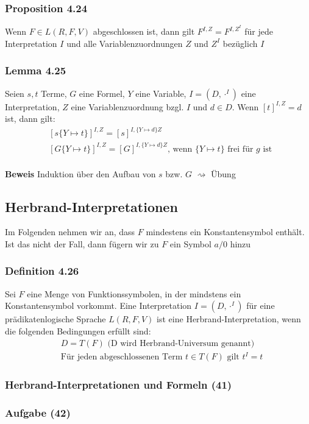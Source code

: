 \subsubsection{Proposition 4.24}
Wenn \(F\in L(R,F,V)\) abgeschlossen ist, dann gilt \(F^{I,Z} = F^{I,Z^I}\) für jede Interpretation \(I\) und alle Variablenzuordnungen \(Z\) und \(Z^I\) bezüglich \(I\)
\subsubsection{Lemma 4.25}
Seien \(s,t\) Terme, \(G\) eine Formel, \(Y\) eine Variable, \(I=(D,\cdot ^I)\) eine Interpretation, \(Z\) eine Variablenzuordnung bzgl. \(I\) und \(d\in D\). Wenn \([t]^{I,Z}= d\) ist, dann gilt:
\begin{align*}
&[s\{Y\mapsto t\}]^{I,Z}=[s]^{I,\{Y\mapsto d\} Z} \\
&[G\{Y\mapsto t\}]^{I,Z}=[G]^{I,\{Y\mapsto d\} Z}\text{, wenn } \{Y\mapsto t\} \text{ frei für } g \text{ ist }
\end{align*}
\\\textbf{Beweis} Induktion über den Aufbau von \(s\) bzw. \(G\) \(\rightsquigarrow\) Übung
\subsection{Herbrand-Interpretationen}
Im Folgenden nehmen wir an, dass \(F\) mindestens ein Konstantensymbol enthält. Ist das nicht der Fall, dann fügern wir zu \(F\) ein Symbol \(a/0\) hinzu
\subsubsection{Definition 4.26}
Sei \(F\) eine Menge von Funktionssymbolen, in der mindstens ein Konstantensymbol vorkommt. Eine Interpretation \(I=(D,\cdot ^I)\) für eine prädikatenlogische Sprache \(L(R,F,V)\) ist eine Herbrand-Interpretation, wenn die folgenden Bedingungen erfüllt sind:
\begin{align*}
	&D = T(F) \text{ (D wird Herbrand-Universum genannt})\\
	&\text{Für jeden abgeschlossenen Term } t\in T(F) \text{ gilt } t^I = t
\end{align*}
\subsubsection{Herbrand-Interpretationen und Formeln (41)}
\subsubsection{Aufgabe (42)}
